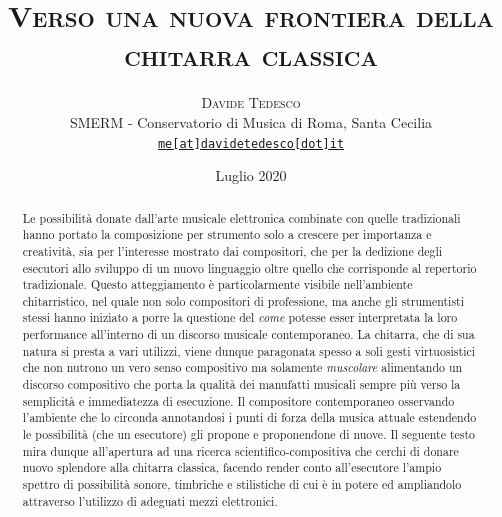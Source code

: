\documentclass[oneside]{article}
\title{\vspace{-15mm}\fontsize{24pt}{10pt}\selectfont\textsf{\bfseries{\textsc{Verso una nuova frontiera della
 chitarra classica}}}} %
\author{
\large
\textsc{Davide Tedesco}\\
\small{SMERM - Conservatorio di Musica di Roma, Santa Cecilia}\\
\small \href{mailto:me@davidetedesco.it}{\texttt{me[at]davidetedesco[dot]it}} 
}
\date{Luglio 2020}
\begin{document}
\maketitle %

\tableofcontents

\thispagestyle{empty} 


\begin{abstract}

Le possibilità donate dall'arte musicale elettronica combinate con quelle tradizionali hanno portato la composizione per strumento solo a crescere per importanza e creatività, sia per l'interesse mostrato dai compositori, che per la dedizione degli esecutori allo sviluppo di un nuovo linguaggio oltre quello che corrisponde al repertorio tradizionale. Questo atteggiamento è particolarmente visibile nell'ambiente chitarristico, nel quale non solo compositori di professione, ma anche gli strumentisti stessi hanno iniziato a porre la questione del \textit{come} potesse esser interpretata la loro performance all'interno di un discorso musicale contemporaneo. La chitarra, che di sua natura si presta a vari utilizzi, viene dunque paragonata spesso a soli gesti virtuosistici che non nutrono un vero senso compositivo ma solamente \textit{muscolare} alimentando un discorso compositivo che porta la qualità dei manufatti musicali sempre più verso la semplicità e immediatezza di esecuzione. Il compositore contemporaneo osservando l'ambiente che lo circonda annotandosi i punti di forza della musica attuale estendendo le possibilità (che un esecutore) gli propone e proponendone di nuove. Il seguente testo mira dunque all'apertura ad una ricerca scientifico-compositiva che cerchi di donare nuovo splendore alla chitarra classica, facendo render conto all'esecutore l'ampio spettro di possibilità sonore, timbriche e stilistiche di cui è in potere ed ampliandolo attraverso l'utilizzo di adeguati mezzi elettronici.

\end{abstract}
\end{document}
